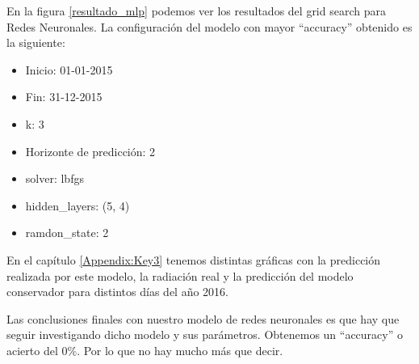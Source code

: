 En la figura \ref{resultado_mlp} podemos ver los resultados del grid search para Redes Neuronales. La configuración del modelo con mayor ``accuracy'' obtenido es la siguiente:

\begin{itemize}
\item Inicio: 01-01-2015
\item Fin: 31-12-2015
\item k: 3
\item Horizonte de predicción: 2
\item solver: lbfgs
\item hidden\_layers: (5, 4)
\item ramdon\_state: 2
\end{itemize}

En el capítulo \ref{Appendix:Key3} tenemos distintas gráficas con la predicción realizada por este modelo, la radiación real y la predicción del modelo conservador para distintos días del año 2016.

Las conclusiones finales con nuestro modelo de redes neuronales es que hay que seguir investigando dicho modelo y sus parámetros. Obtenemos un ``accuracy'' o acierto del 0\%. Por lo que no hay mucho más que decir.